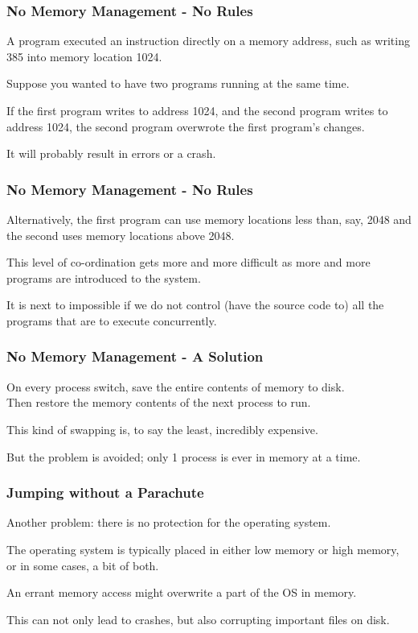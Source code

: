 \begin{frame}
\frametitle{No Memory Management - No Rules}

A program executed an instruction directly on a memory address, such as writing 385 into memory location 1024. 

Suppose you wanted to have two programs running at the same time. 

If the first program writes to address 1024, and the second program writes to address 1024, the second program overwrote the first program's changes. 

It will probably result in errors or a crash. 

\end{frame}

\begin{frame}
\frametitle{No Memory Management - No Rules}

Alternatively, the first program can use memory locations less than, say, 2048 and the second uses memory locations above 2048. 

This level of co-ordination gets more and more difficult as more and more programs are introduced to the system.

It is next to impossible if we do not control (have the source code to) all the programs that are to execute concurrently.



\end{frame}

\begin{frame}
\frametitle{No Memory Management - A Solution}

On every process switch, save the entire contents of memory to disk.\\
\quad Then restore the memory contents of the next process to run. 

This kind of swapping is, to say the least, incredibly expensive.

But the problem is avoided; only 1 process is ever in memory at a time.


\end{frame}

\begin{frame}
\frametitle{Jumping without a Parachute}

Another problem: there is no protection for the operating system. 

The operating system is typically placed in either low memory or high memory, or in some cases, a bit of both. 

An errant memory access might overwrite a part of the OS in memory.

This can not only lead to crashes, but also corrupting important files on disk.



\end{frame}

